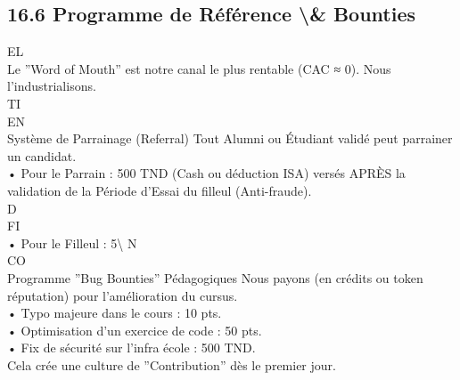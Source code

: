 \subsection{16.6 Programme de Référence \textbackslash{}& Bounties}
\vspace{0.5em}
\vspace{0.5em}
\vspace{0.5em}
\vspace{0.5em}
EL\\
Le ”Word of Mouth” est notre canal le plus rentable (CAC ≈ 0). Nous l’industrialisons.\\
\vspace{0.5em}
\vspace{0.5em}
\vspace{0.5em}
\vspace{0.5em}
TI\\
EN\\
Système de Parrainage (Referral)       Tout Alumni ou Étudiant validé peut parrainer un candidat.\\
\vspace{0.5em}
• Pour le Parrain : 500 TND (Cash ou déduction ISA) versés APRÈS la validation de la Période d’Essai du filleul (Anti-fraude).\\
\vspace{0.5em}
\vspace{0.5em}
\vspace{0.5em}
\vspace{0.5em}
D\\
FI\\
• Pour le Filleul : 5\textbackslash{}%
\vspace{0.5em}
N\\
CO\\
Programme ”Bug Bounties” Pédagogiques           Nous payons (en crédits ou token réputation) pour l’amélioration du cursus.\\
\vspace{0.5em}
• Typo majeure dans le cours : 10 pts.\\
\vspace{0.5em}
• Optimisation d’un exercice de code : 50 pts.\\
\vspace{0.5em}
• Fix de sécurité sur l’infra école : 500 TND.\\
\vspace{0.5em}
Cela crée une culture de ”Contribution” dès le premier jour.\\

